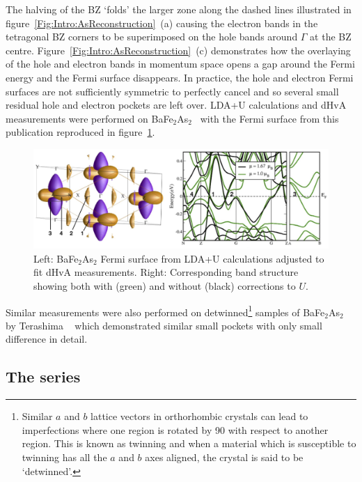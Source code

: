 The halving of the \ac{BZ} `folds' the larger zone along the dashed lines illustrated in figure~\ref{Fig:Intro:AsReconstruction}~(a) causing the electron bands in the tetragonal \ac{BZ} corners to be superimposed on the hole bands around $\Gamma$ at the \ac{BZ} centre. Figure~\ref{Fig:Intro:AsReconstruction}~(c) demonstrates how the overlaying of the hole and electron bands in momentum space opens a gap around the Fermi energy and the Fermi surface disappears. In practice, the hole and electron Fermi surfaces are not sufficiently symmetric to perfectly cancel and so several small residual hole and electron pockets are left over. \acs{LDA}+U calculations and \ac{dHvA} measurements were performed on BaFe$_2$As$_2$~\cite{Analytis2010b} with the Fermi surface from this publication reproduced in figure~\ref{Fig:Intro:FSBaFeAs}.
\begin{figure}[htbp]
    \begin{center}
        \includegraphics[scale=0.7]{Chapter-Introduction/Figures/FSBaFeAs/FSBaFeAs}
        \caption{Left: BaFe$_2$As$_2$ Fermi surface from \acs{LDA}+U calculations adjusted to fit \ac{dHvA} measurements. Right: Corresponding band structure showing both with (green) and without (black) corrections to $U$.}
        \label{Fig:Intro:FSBaFeAs}
    \end{center}
\end{figure}
Similar measurements were also performed on detwinned\footnote{Similar $a$ and $b$ lattice vectors in orthorhombic crystals can lead to imperfections where one region is rotated by \unit{90}{\degree} with respect to another region. This is known as twinning and when a material which is susceptible to twinning has all the $a$ and $b$ axes aligned, the crystal is said to be `detwinned'.} samples of BaFe$_2$As$_2$ by Terashima \etal~\cite{Terashima2011} which demonstrated similar small pockets with only small difference in detail.


\subsection{The \BaFePAs series}


